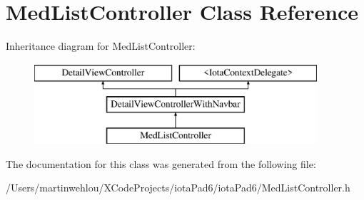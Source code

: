 \hypertarget{interface_med_list_controller}{
\section{MedListController Class Reference}
\label{interface_med_list_controller}
}
Inheritance diagram for MedListController:\begin{figure}[H]
\begin{center}
\leavevmode
\includegraphics[height=3.000000cm]{interface_med_list_controller}
\end{center}
\end{figure}


The documentation for this class was generated from the following file:\begin{DoxyCompactItemize}
\item 
/Users/martinwehlou/XCodeProjects/iotaPad6/iotaPad6/MedListController.h\end{DoxyCompactItemize}
